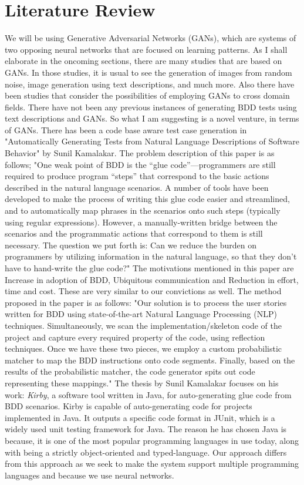\documentclass[conference, onecolumn, a4, 12pt]{IEEEtran}
\begin{document}
\section{Literature Review}
We will be using Generative Adversarial Networks (GANs), which are systems of two opposing neural networks that are focused on learning patterns. As I shall elaborate in the oncoming sections, there are many studies that are based on GANs. In those studies, it is usual to see the generation of images from random noise, \cite{b2} image generation using text descriptions, \cite{b5} and much more. Also there have been studies that consider the possibilities of employing GANs to cross domain fields.\cite{b3}\newline
There have not been any previous instances of generating BDD tests using text descriptions and GANs. So what I am suggesting is a novel venture, in terms of GANs.
There has been a code base aware test case generation in "Automatically Generating Tests from Natural Language Descriptions of Software Behavior" by Sunil Kamalakar. The problem description of this paper is as follows; "One weak point of BDD is the “glue code”—programmers are still required to produce program “steps” that correspond to the basic actions described in the natural language scenarios. A number of tools have been developed to make the process of writing this glue code easier and streamlined, and to automatically map phrases in the scenarios onto such steps (typically using regular expressions). However, a manually-written bridge between the scenarios and the programmatic actions that correspond to them is still necessary. The question we put forth is: Can we reduce the burden on programmers by utilizing information in the natural language, so that they don’t have to hand-write the glue code?"\cite{a2} 
The motivations mentioned in this paper are Increase in adoption of BDD, Ubiquitous communication and Reduction in effort, time and cost. These are very similar to our convictions as well. The method proposed in the paper is as follows: "Our solution is to process the user stories written for BDD using state-of-the-art Natural Language Processing (NLP) techniques. Simultaneously, we scan the implementation/skeleton code of the project and capture every required property of the code, using reﬂection techniques. Once we have these two pieces, we employ a custom probabilistic matcher to map the BDD instructions onto code segments. Finally, based on the results of the probabilistic matcher, the code generator spits out code representing these mappings."\cite{a2}
The thesis by Sunil Kamalakar focuses on his work: \textit{Kirby}, a software tool written in Java, for auto-generating glue code from BDD scenarios. Kirby is capable of auto-generating code for projects implemented in Java. It outputs a speciﬁc code format in JUnit, which is a widely used unit testing framework for Java. The reason he has chosen Java is because, it is one of the most popular programming languages in use today, along with being a strictly object-oriented and typed-language.\cite{a2} Our approach differs from this approach as we seek to make the system support multiple programming languages and because we use neural networks.
\end{document}
